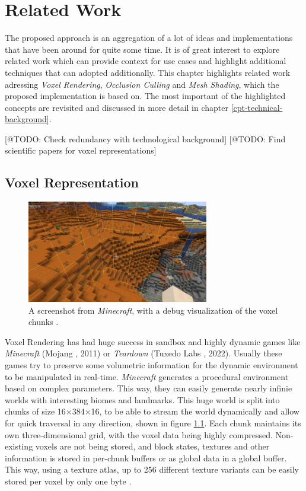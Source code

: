 \chapter{Related Work} \label{cpt-related-work}

The proposed approach is an aggregation of a lot of ideas and implementations that have been 
around for quite some time. It is of great interest to explore related work which can provide 
context for use cases and highlight additional techniques that can adopted additionally. This 
chapter highlights related work adressing \emph{Voxel Rendering}, \emph{Occlusion Culling} 
and \emph{Mesh Shading}, which the proposed implementation is based on. The most important of 
the highlighted concepts are revisited and discussed in more detail in chapter 
\ref{cpt-technical-background}. 

[@TODO: Check redundancy with technological background]
[@TODO: Find scientific papers for voxel representations]

\section*{Voxel Representation} \label{sec-voxel-representation}

\begin{figure}[h]
    \centering
    \includegraphics[width=300px]{images/graphics/minecraft-chunks.jpg}
    \caption{A screenshot from \emph{Minecraft}, with a debug visualization of the voxel chunks \cite{Palm2022}.}
    \label{fig:minecraft-chunks}
\end{figure}

\noindent
Voxel Rendering has had huge success in sandbox and highly dynamic games like \emph{Minecraft} (Mojang 
\cite{Mojang2024}, 2011) or \emph{Teardown} (Tuxedo Labs \cite{TuxedoLabs2022}, 2022). Usually these games try 
to preserve some volumetric information for the dynamic environment to be manipulated in real-time. \emph{Minecraft} 
generates a procedural environment based on complex parameters. This way, they can easily generate nearly infinie 
worlds with interesting biomes and landmarks. This huge world is split into chunks of size 16×384×16, to be able to 
stream the world dynamically and allow for quick traversal in any direction, shown in figure \ref{fig:minecraft-chunks}.
Each chunk maintains its own three-dimensional grid, with the voxel data being highly compressed. Non-existing voxels 
are not being stored, and block states, textures and other information is stored in per-chunk buffers or as global 
data in a global buffer. This way, using a texture atlas, up to 256 different texture variants can be easily stored 
per voxel by only one byte \cite{Bergensten2012, MinecraftFandom2021}. \\

